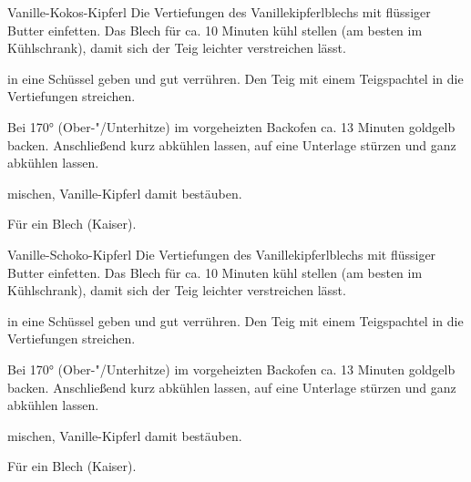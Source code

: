 \begin{recipe}{Vanille-Kokos-Kipferl}
  Die Vertiefungen des Vanillekipferlblechs mit flüssiger Butter
  einfetten. Das Blech für ca. 10 Minuten kühl stellen (am besten im
  Kühlschrank), damit sich der Teig leichter verstreichen lässt.
  
  in eine Schüssel geben und gut verrühren. Den Teig mit einem
  Teigspachtel in die Vertiefungen streichen.

  Bei 170° (Ober-"/Unterhitze) im vorgeheizten Backofen ca. 13 Minuten
  goldgelb backen. Anschließend kurz abkühlen lassen, auf eine Unterlage
  stürzen und ganz abkühlen lassen.
  
  mischen, Vanille-Kipferl damit bestäuben.

  Für ein Blech (Kaiser).
\end{recipe}



\begin{recipe}{Vanille-Schoko-Kipferl}
  Die Vertiefungen des Vanillekipferlblechs mit flüssiger Butter
  einfetten. Das Blech für ca. 10 Minuten kühl stellen (am besten im
  Kühlschrank), damit sich der Teig leichter verstreichen lässt.
  
  in eine Schüssel geben und gut verrühren. Den Teig mit einem
  Teigspachtel in die Vertiefungen streichen.

  Bei 170° (Ober-"/Unterhitze) im vorgeheizten Backofen ca. 13 Minuten
  goldgelb backen. Anschließend kurz abkühlen lassen, auf eine Unterlage
  stürzen und ganz abkühlen lassen.
  
  mischen, Vanille-Kipferl damit bestäuben.

  Für ein Blech (Kaiser).
\end{recipe}



